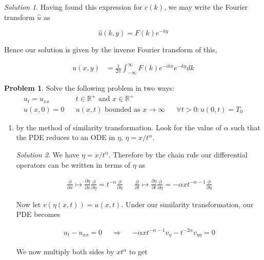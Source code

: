 \documentclass[12pt,a4paper]{article}
\theoremstyle{definition}
\newtheorem{problem}{Problem}
\theoremstyle{remark}
\newtheorem*{solution}{Solution}
\begin{document}
\begin{solution}
    Having found this expression for $c(k)$, we may write the Fourier transform $\hat u$ as

    $$\hat u(k,y) = F(k) e^{-ky}$$

    Hence our solution is given by the inverse Fourier transform of this,

    \begin{align*}
        u(x,y) &= \frac{1}{2\pi} \int_{-\infty}^\infty F(k) e^{-ikx} e^{-ky} dk
    \end{align*}
\end{solution}

\begin{problem}
    Solve the following problem in two ways: 
    \begin{align*}
        u_t = u_{xx} && t \in \mathbb R^+ \text{ and } x \in \mathbb R^+\\
        u(x,0) = 0 && u(x,t) \text{ bounded as } x \rightarrow \infty && \forall t > 0:  u(0,t) = T_0 
    \end{align*}

    \begin{enumerate}
        \item by the method of similarity transformation. Look for the value of $\alpha$ such that the PDE reduces to an ODE in $\eta$, $\eta=x/t^{\alpha}$.
        \begin{solution}
            We have $\eta = x/t^{\alpha}$. Therefore by the chain rule our differential operators can be written in terms of $\eta$ as 

            \begin{align*}
                \frac{\partial}{\partial x} \mapsto \frac{\partial \eta}{\partial x}\frac{\partial}{\partial \eta} = t^{-\alpha} \frac{\partial}{\partial \eta} && \frac{\partial}{\partial t} \mapsto \frac{\partial \eta}{\partial t}\frac{\partial}{\partial \eta} = -\alpha x t^{-\alpha -1} \frac{\partial}{\partial \eta}
            \end{align*}

            Now let $v(\eta(x,t)) = u(x,t)$. Under our similarity transformation, our PDE becomes 

            \begin{align*}
                u_t - u_{xx} = 0 && \Rightarrow && -\alpha x t^{-\alpha -1} v_\eta - t^{-2\alpha} v_{\eta\eta}=0
            \end{align*}

            We now multiply both sides by $xt^{\alpha}$ to get 


\end{solution}
\end{enumerate}
\end{problem}
\end{document}
